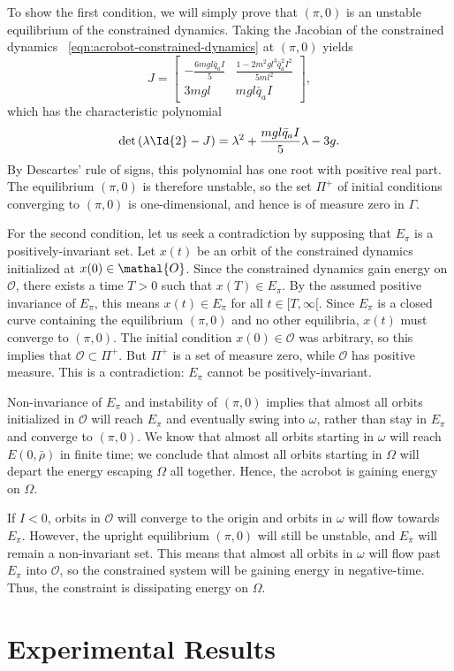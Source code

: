 To show the first condition, we will simply prove that \((\pi,0)\) is an
unstable equilibrium of the constrained dynamics.
Taking the Jacobian of the constrained dynamics
~\eqref{eqn:acrobot-constrained-dynamics} at \((\pi,0)\) yields
\[
    J = \begin{bmatrix}
        -\frac{6mgl\bar{q}_aI}{5} & \frac{1 - 2m^2gl^3\bar{q}_a^2 I^2}{5ml^2} \\
        3mgl & mgl\bar{q}_aI
    \end{bmatrix}
    ,
\]
which has the characteristic polynomial
\[
    \det\left(\lambda \Id{2} - J\right)
    = \lambda^2 + \frac{mgl\bar{q}_a I}{5} \lambda - 3g
    .
\]
By Descartes' rule of signs, this polynomial has one root with positive real
part. 
The equilibrium \((\pi,0)\) is therefore unstable, so the set \(\Pi^+\) of
initial conditions converging to \((\pi,0)\) is one-dimensional, and hence is
of measure zero in \(\Gamma\).

For the second condition, let us seek a contradiction by 
supposing that \(E_\pi\) is a positively-invariant set. 
Let \(x(t)\) be an orbit of the constrained dynamics initialized at 
\(x(0) \in \mathal{O}\).
Since the constrained dynamics gain energy on \(\mathcal{O}\), there exists a
time \(T > 0\) such that \(x(T) \in E_\pi\).
By the assumed positive invariance of \(E_\pi\), this means 
\(x(t) \in E_\pi\) for all \(t \in [T,\infty[\).
Since \(E_\pi\) is a closed curve containing the equilibrium \((\pi,0)\) and no
other equilibria, \(x(t)\) must converge to \((\pi,0)\).
The initial condition \(x(0) \in \mathcal{O}\) was arbitrary, so this implies
that \(\mathcal{O} \subset \Pi^+\).
But \(\Pi^+\) is a set of measure zero, while \(\mathcal{O}\) has positive
measure. 
This is a contradiction: \(E_\pi\) cannot be positively-invariant.

Non-invariance of \(E_\pi\) and instability of \((\pi,0)\) implies that 
almost all orbits initialized in \(\mathcal{O}\) will reach \(E_\pi\) and
eventually swing into \(\omega\), rather than stay in \(E_\pi\) and converge to
\((\pi,0)\). 
We know that almost all orbits starting in \(\omega\) will reach 
\(E(0,\bar{\rho})\) in finite time;
we conclude that almost all orbits starting in \(\Omega\) will depart the energy
escaping \(\Omega\) all together.
Hence, the acrobot is gaining energy on \(\Omega\).

If \(I < 0\), orbits in \(\mathcal{O}\) will converge to the origin and orbits in
\(\omega\) will flow towards \(E_\pi\).
However, the upright equilibrium \((\pi,0)\) will still be unstable, and
\(E_\pi\) will remain a non-invariant set. 
This means that almost all orbits in \(\omega\) will flow past \(E_\pi\) into
\(\mathcal{O}\), so the constrained system will be gaining energy in
negative-time. Thus, the constraint is dissipating energy on \(\Omega\).

\section{Experimental Results}

